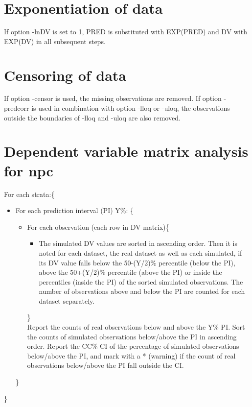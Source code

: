 \section{Exponentiation of data}
If option -lnDV is set to 1,  PRED is substituted with EXP(PRED) and DV with EXP(DV) in all subsequent steps. 

\section{Censoring of data}
If option -censor is used, the missing observations are removed. If option -predcorr is used in combination with option -lloq or -uloq, the observations outside the boundaries of -lloq and -uloq are also removed.

\section{Dependent variable matrix analysis for npc}
For each strata:\{
\begin{itemize}
\item[] For each prediction interval (PI) Y\%: \{
\begin{itemize}
\item[] For each observation (each row in DV matrix)\{
\begin{itemize}
\item[] The simulated DV values are sorted in ascending order. Then it is noted for each dataset, the real dataset as well as each simulated, if its DV value falls below the 50-(Y/2)\% percentile (below the PI), above the 50+(Y/2)\% percentile (above the PI) or inside the percentiles (inside the PI) of the sorted simulated observations. The number of observations above and below the PI are counted for each dataset separately.
\end{itemize}
\}\\
Report the counts of real observations below and above the Y\% PI. Sort the counts of simulated observations below/above the PI in ascending order. Report the CC\% CI of the percentage of simulated observations below/above the PI, and mark with a * (warning) if the count of real observations below/above the PI fall outside the CI.
\end{itemize}
\}
\end{itemize}
\}

